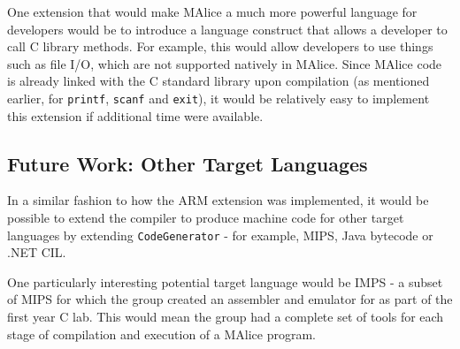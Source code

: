 \documentclass[a4wide, 11pt]{article}
\begin{document}
One extension that would make MAlice a much more powerful language for 
developers would be to introduce a language construct that allows a developer 
to call C library methods. For example, this would allow developers to use 
things such as file I/O, which are not supported natively in MAlice. Since 
MAlice code is already linked with the C standard library upon compilation
(as mentioned earlier, for \texttt{printf}, \texttt{scanf} and \texttt{exit}),
it would be relatively easy to implement this extension if additional time
were available.

\subsection{Future Work: Other Target Languages}
In a similar fashion to how the ARM extension was implemented, it would be 
possible to extend the compiler to produce machine code for other target 
languages by extending \texttt{CodeGenerator} -
for example, MIPS, Java bytecode or .NET CIL. 

One particularly interesting potential target language would be IMPS - a subset
of MIPS for which the group created an assembler and emulator for as part of the
first year C lab. This would mean the group had a complete set of tools for
each stage of compilation and execution of a MAlice program.

\enddocument
\end{document}
